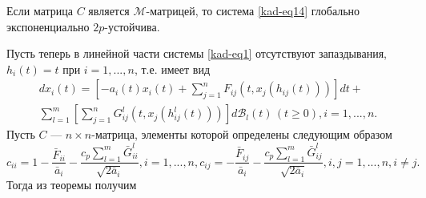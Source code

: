 \begin{corollary}\label{kad-col1}
Если матрица $C$ является $\mathcal
M$-матрицей, то система \eqref{kad-eq14} глобально экспоненциально
$2p$-устойчива.
\end{corollary}
Пусть теперь в линейной части системы \eqref{kad-eq1} отсутствуют запаздывания,
$h_i(t) = t$ при $i = 1,...,n$,  т.е. имеет вид
\begin{equation}\label{kad-eq15}
\begin{array}{crl}
dx_i(t) = \left [-a_i(t)x_i(t)+ \sum
\limits_{j=1}^nF_{ij}(t,x_j(h_{ij}(t)))\right]dt +\\
 \sum \limits_{l=1}^m \left [\sum
\limits_{j=1}^nG^l_{ij}(t,x_j(h^l_{ij}(t)))\right ]d\mathcal B_l(t)
\, (t \ge 0), i = 1,...,n.
\end{array}
\end{equation}
Пусть $C$ --- $n\times n$-матрица, элементы которой определены
следующим образом
$$
c_{ii} = 1 - \frac{\bar F_{ii}}{\bar a_i} - \frac{c_p\sum \limits
_{l=1}^m \bar G^l_{ii}}{\sqrt{2\bar a_i}}, i = 1,...,n, c_{ij} = -
\frac{\bar F_{ij}}{\bar a_i} - \frac{c_p\sum \limits _{l=1}^m \bar
G^l_{ij}}{\sqrt{2\bar a_i}}, i,j = 1,...,n, i\neq j.
$$
Тогда из теоремы получим

